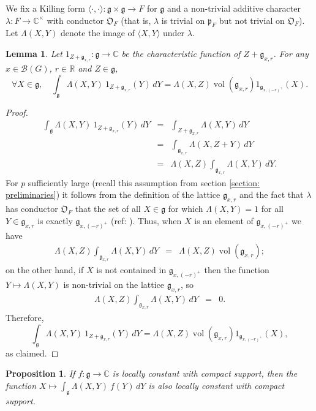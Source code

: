 \documentclass[11pt]{amsart}
\newtheorem{proposition}[theorem]{Proposition}
\newtheorem{lemma}[theorem]{Lemma}
\theoremstyle{definition}
\theoremstyle{remark}
\numberwithin{equation}{theorem}
\def\R{{\mathbb{R}}}
\def\C{{\mathbb{C}}}
\def\F{{F}}
\def\A{{\mathfrak{O}_\F}}
\def\pFA{{\mathfrak{p}_\F}}
\def\GF{{G}}
\def\gF{{\mathfrak{g}}}
\def\Kill#1#2{{\langle{#1},{#2}\rangle}}
\def\kill#1#2{{\Lambda\left({#1},{#2}\right)}}
\def\B{{\mathcal{B}}}
\def\vol{{\operatorname{vol}}}
\def\vol{\operatorname{vol}}
\begin{document}
We fix a Killing form $\Kill{\cdot}{\cdot}:\gF\times\gF\to\F$ for
$\gF$ and a non-trivial additive character
$\lambda:\F\to\C^\times$ with conductor $\A$ (that is, $\lambda$
is trivial on $\pFA$ but not trivial on $\A$).  Let $\kill{X}{Y}$
denote the image of $\Kill{X}{Y}$ under $\lambda$.

\begin{lemma}\label{lemma: FT}
Let $1_{Z+\gF_{x,r}} : \gF \to \C$ be the characteristic function
of $Z+\gF_{x,r}$. For any $x\in \B(\GF)$, $r\in \R$ and $Z\in
\gF$,
\begin{equation}\label{equation: FT}
\forall X\in \gF, \quad \int_{\gF} \kill{X}{Y}\ 1_{Z+\gF_{x,r}}
(Y)\, dY
 = \kill{X}{Z} \vol(\gF_{x,r}) 1_{\gF_{x,(-r)^+}}(X).
\end{equation}
\end{lemma}

\begin{proof}
\begin{eqnarray*}
\int_{\gF} \kill{X}{Y}\ 1_{Z+\gF_{x,r}} (Y)\, dY
 &=& \int_{Z+\gF_{x,r}} \kill{X}{Y}\, dY\\
 &=& \int_{\gF_{x,r}} \kill{X}{Z+Y}\, dY\\
 &=& \kill{X}{Z}\int_{\gF_{x,r}} \kill{X}{Y}\, dY.
\end{eqnarray*}
For $p$ sufficiently large (recall this assumption from section
\ref{section: preliminaries}) it follows from the definition of
the lattice $\gF_{x,r}$ and the fact that $\lambda$ has conductor
$\A$ that the set of all $X\in \gF$ for which $\kill{X}{Y}=1$ for
all $Y\in \gF_{x,r}$ is exactly $\gF_{x,(-r)^+}$ (ref:
\cite[\S~4]{Adler}). Thus, when $X$ is an element of
$\gF_{x,(-r)^+}$ we have
\begin{eqnarray*}
\kill{X}{Z}\int_{\gF_{x,r}} \kill{X}{Y}\, dY
 &=& \kill{X}{Z} \vol(\gF_{x,r});
\end{eqnarray*}
on the other hand, if $X$ is not contained in $\gF_{x,(-r)^+}$
then the function $Y \mapsto \kill{X}{Y}$ is non-trivial on the
lattice $\gF_{x,r}$, so
\begin{eqnarray*}
\kill{X}{Z}\int_{\gF_{x,r}} \kill{X}{Y}\, dY
 &=& 0.
\end{eqnarray*}
Therefore,
\begin{equation}
\int_{\gF} \kill{X}{Y}\ 1_{Z+\gF_{x,r}} (Y)\, dY
 = \kill{X}{Z} \vol(\gF_{x,r}) 1_{\gF_{x,(-r)^+}}(X),
\end{equation}
as claimed.
\end{proof}

\begin{proposition}\label{proposition: FT}
If $f: \gF \to \C$ is locally constant with compact support, then
the function $X \mapsto \int_{\gF} \kill{X}{Y}\ f(Y)\, dY$ is also
locally constant with compact support.
\end{proposition}
\end{document}
